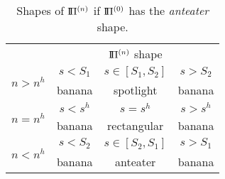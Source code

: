 %
\begin{table}
\centering
\begin{tabular}{cccc}
\toprule
 & \multicolumn{3}{c}{$\text{I}\!\Pi^{(n)}$ shape} \\
\cmidrule{2-4}
\multirow{2}{*}{$n > n^h$} & $s < S_1$ & $s \in [S_1, S_2]$ & $s > S_2$ \\
                           & banana    & spotlight          & banana \\
\midrule
\multirow{2}{*}{$n = n^h$} & $s < s^h$ & $s = s^h$          & $s > s^h$ \\
                           & banana    &  rectangular       &  banana \\
\midrule
\multirow{2}{*}{$n < n^h$} & $s < S_2$ & $s \in [S_2, S_1]$ & $s > S_1$ \\
                           & banana    & anteater           &  banana \\
\bottomrule
\end{tabular}
\caption{Shapes of $\text{I}\!\Pi^{(n)}$ if $\text{I}\!\Pi^{(0)}$ has the \emph{anteater} shape.}
\label{tab:anteater-shapes}
\end{table}


